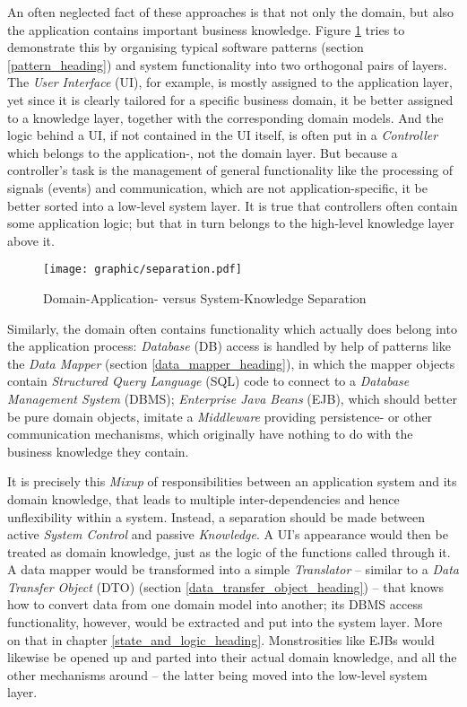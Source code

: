 An often neglected fact of these approaches is that not only the domain, but
also the application contains important business knowledge. Figure
\ref{separation_figure} tries to demonstrate this by organising typical
software patterns (section \ref{pattern_heading}) and system functionality into
two orthogonal pairs of layers. The \emph{User Interface} (UI), for example, is
mostly assigned to the application layer, yet since it is clearly tailored for
a specific business domain, it be better assigned to a knowledge layer,
together with the corresponding domain models. And the logic behind a UI, if
not contained in the UI itself, is often put in a \emph{Controller} which
belongs to the application-, not the domain layer. But because a controller's
task is the management of general functionality like the processing of signals
(events) and communication, which are not application-specific, it be better
sorted into a low-level system layer. It is true that controllers often contain
some application logic; but that in turn belongs to the high-level knowledge
layer above it.

\begin{figure}[ht]
    \begin{center}
        \texttt{[image: graphic/separation.pdf]}
        \caption{Domain-Application- versus System-Knowledge Separation}
        \label{separation_figure}
    \end{center}
\end{figure}

Similarly, the domain often contains functionality which actually does belong
into the application process: \emph{Database} (DB) access is handled by help of
patterns like the \emph{Data Mapper} (section \ref{data_mapper_heading}), in
which the mapper objects contain \emph{Structured Query Language} (SQL) code to
connect to a \emph{Database Management System} (DBMS);
\emph{Enterprise Java Beans} (EJB), which should better be pure domain objects,
imitate a \emph{Middleware} providing persistence- or other communication
mechanisms, which originally have nothing to do with the business knowledge
they contain.

It is precisely this \emph{Mixup} of responsibilities between an application
system and its domain knowledge, that leads to multiple inter-dependencies and
hence unflexibility within a system. Instead, a separation should be made
between active \emph{System Control} and passive \emph{Knowledge}. A UI's
appearance would then be treated as domain knowledge, just as the logic of the
functions called through it. A data mapper would be transformed into a simple
\emph{Translator} -- similar to a \emph{Data Transfer Object} (DTO) (section
\ref{data_transfer_object_heading}) -- that knows how to convert data from one
domain model into another; its DBMS access functionality, however, would be
extracted and put into the system layer. More on that in chapter
\ref{state_and_logic_heading}. Monstrosities like EJBs would likewise be opened
up and parted into their actual domain knowledge, and all the other mechanisms
around -- the latter being moved into the low-level system layer.


